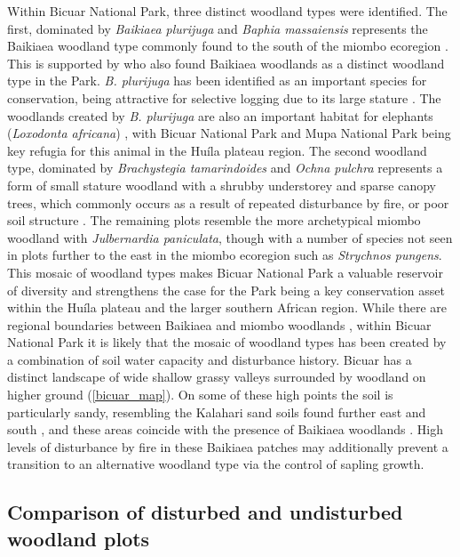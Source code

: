 \documentclass[diversity,article,submit,moreauthors,pdftex]{Definitions/mdpi}
\begin{document}
Within Bicuar National Park, three distinct woodland types were identified. The first, dominated by \textit{Baikiaea plurijuga} and \textit{Baphia massaiensis} represents the Baikiaea woodland type commonly found to the south of the miombo ecoregion \citep{Timberlake2010}. This is supported by \citet{Chisingui2018} who also found Baikiaea woodlands as a distinct woodland type in the Park. \textit{B. plurijuga} has been identified as an important species for conservation, being attractive for selective logging due to its large stature \citep{Ngandwe2017, Wallenfang2015}. The woodlands created by \textit{B. plurijuga} are also an important habitat for elephants (\textit{Loxodonta africana}) \citep{Sianga2017, Mukwashi2012}, with Bicuar National Park and Mupa National Park being key refugia for this animal in the Hu\'{i}la plateau region. The second woodland type, dominated by \textit{Brachystegia tamarindoides} and \textit{Ochna pulchra} represents a form of small stature woodland with a shrubby understorey and sparse canopy trees, which commonly occurs as a result of repeated disturbance by fire, or poor soil structure \citep{Smith2004}. The remaining plots resemble the more archetypical miombo woodland with \textit{Julbernardia paniculata}, though with a number of species not seen in plots further to the east in the miombo ecoregion such as \textit{Strychnos pungens}. This mosaic of woodland types makes Bicuar National Park a valuable reservoir of diversity and strengthens the case for the Park being a key conservation asset within the Hu\'{i}la plateau and the larger southern African region. While there are regional boundaries between Baikiaea and miombo woodlands \citep{White1983}, within Bicuar National Park it is likely that the mosaic of woodland types has been created by a combination of soil water capacity and disturbance history. Bicuar has a distinct landscape of wide shallow grassy valleys surrounded by woodland on higher ground (\autoref{bicuar_map}). On some of these high points the soil is particularly sandy, resembling the Kalahari sand soils found further east and south \citep{Huntley2019}, and these areas coincide with the presence of Baikiaea woodlands \citep{Campbell2002}. High levels of disturbance by fire in these Baikiaea patches may additionally prevent a transition to an alternative woodland type via the control of sapling growth.

\subsection{Comparison of disturbed and undisturbed woodland plots}
\end{document}
